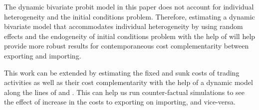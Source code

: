 \documentclass[12pt]{article}
\begin{document}
The dynamic bivariate probit model in this paper does not account for
individual heterogeneity and the initial conditions
problem. Therefore, estimating a dynamic bivariate model that
accommodates individual heterogeneity by using random effects and the
endogeneity of initial conditions problem with the help of
\textcite{wooldridge2005simple} will help provide more robust
results for contemporaneous cost complementarity between exporting and
importing. 

This work can be extended by estimating the fixed and sunk
costs of trading activities as well as their cost
complementarity with the help of a dynamic model along the lines of
\textcite{kasahara2013productivity} and \textcite{aw2011}. This can
help us run  counter-factual 
simulations to see the effect of increase in the
costs to exporting on importing, and vice-versa.  
\end{document}
